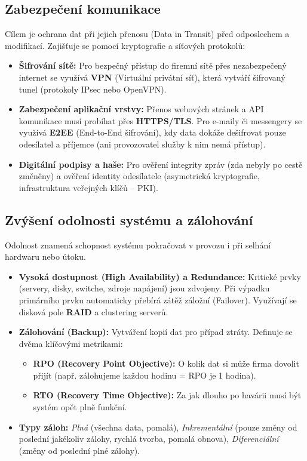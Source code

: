 \subsection{Zabezpečení komunikace}
Cílem je ochrana dat při jejich přenosu (Data in Transit) před odposlechem a modifikací. Zajišťuje se pomocí kryptografie a síťových protokolů:
\begin{itemize}
    \item \textbf{Šifrování sítě:} Pro bezpečný přístup do firemní sítě přes nezabezpečený internet se využívá \textbf{VPN} (Virtuální privátní síť), která vytváří šifrovaný tunel (protokoly IPsec nebo OpenVPN).
    \item \textbf{Zabezpečení aplikační vrstvy:} Přenos webových stránek a API komunikace musí probíhat přes \textbf{HTTPS/TLS}. Pro e-maily či messengery se využívá \textbf{E2EE} (End-to-End šifrování), kdy data dokáže dešifrovat pouze odesílatel a příjemce (ani provozovatel služby k nim nemá přístup).
    \item \textbf{Digitální podpisy a haše:} Pro ověření integrity zpráv (zda nebyly po cestě změněny) a ověření identity odesílatele (asymetrická kryptografie, infrastruktura veřejných klíčů -- PKI).
\end{itemize}

\subsection{Zvýšení odolnosti systému a zálohování}
Odolnost znamená schopnost systému pokračovat v provozu i při selhání hardwaru nebo útoku.
\begin{itemize}
    \item \textbf{Vysoká dostupnost (High Availability) a Redundance:} Kritické prvky (servery, disky, switche, zdroje napájení) jsou zdvojeny. Při výpadku primárního prvku automaticky přebírá zátěž záložní (Failover). Využívají se disková pole \textbf{RAID} a clustering serverů.
    \item \textbf{Zálohování (Backup):} Vytváření kopií dat pro případ ztráty. Definuje se dvěma klíčovými metrikami:
    \begin{itemize}
        \item \textbf{RPO (Recovery Point Objective):} O kolik dat si může firma dovolit přijít (např. zálohujeme každou hodinu = RPO je 1 hodina).
        \item \textbf{RTO (Recovery Time Objective):} Za jak dlouho po havárii musí být systém opět plně funkční.
    \end{itemize}
    \item \textbf{Typy záloh:} \textit{Plná} (všechna data, pomalá), \textit{Inkrementální} (pouze změny od poslední jakékoliv zálohy, rychlá tvorba, pomalá obnova), \textit{Diferenciální} (změny od poslední plné zálohy).
\end{itemize}

